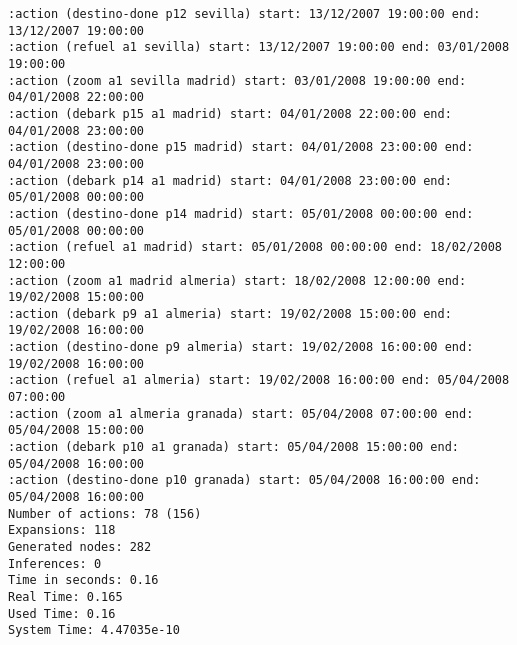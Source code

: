 \documentclass{article}
\begin{document}
\begin{lstlisting}
:action (destino-done p12 sevilla) start: 13/12/2007 19:00:00 end: 13/12/2007 19:00:00
:action (refuel a1 sevilla) start: 13/12/2007 19:00:00 end: 03/01/2008 19:00:00
:action (zoom a1 sevilla madrid) start: 03/01/2008 19:00:00 end: 04/01/2008 22:00:00
:action (debark p15 a1 madrid) start: 04/01/2008 22:00:00 end: 04/01/2008 23:00:00
:action (destino-done p15 madrid) start: 04/01/2008 23:00:00 end: 04/01/2008 23:00:00
:action (debark p14 a1 madrid) start: 04/01/2008 23:00:00 end: 05/01/2008 00:00:00
:action (destino-done p14 madrid) start: 05/01/2008 00:00:00 end: 05/01/2008 00:00:00
:action (refuel a1 madrid) start: 05/01/2008 00:00:00 end: 18/02/2008 12:00:00
:action (zoom a1 madrid almeria) start: 18/02/2008 12:00:00 end: 19/02/2008 15:00:00
:action (debark p9 a1 almeria) start: 19/02/2008 15:00:00 end: 19/02/2008 16:00:00
:action (destino-done p9 almeria) start: 19/02/2008 16:00:00 end: 19/02/2008 16:00:00
:action (refuel a1 almeria) start: 19/02/2008 16:00:00 end: 05/04/2008 07:00:00
:action (zoom a1 almeria granada) start: 05/04/2008 07:00:00 end: 05/04/2008 15:00:00
:action (debark p10 a1 granada) start: 05/04/2008 15:00:00 end: 05/04/2008 16:00:00
:action (destino-done p10 granada) start: 05/04/2008 16:00:00 end: 05/04/2008 16:00:00
Number of actions: 78 (156)
Expansions: 118
Generated nodes: 282
Inferences: 0
Time in seconds: 0.16
Real Time: 0.165
Used Time: 0.16
System Time: 4.47035e-10
\end{lstlisting}
\end{document}
